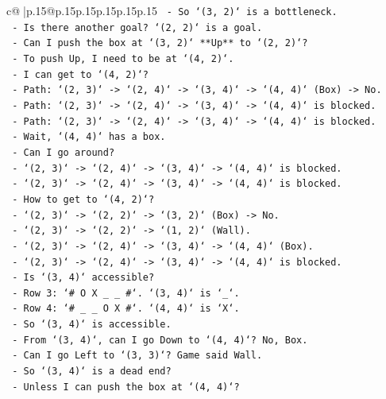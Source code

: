 \documentclass{article}
\begin{document}
{\begin{supertabular}{c@{$\;$}|p{.15\linewidth}@{}p{.15\linewidth}p{.15\linewidth}p{.15\linewidth}p{.15\linewidth}p{.15\linewidth}}
{{{\texttt{    {-} So `(3, 2)` is a bottleneck.} \\
\texttt{    {-} Is there another goal? `(2, 2)` is a goal.} \\
\texttt{    {-} Can I push the box at `(3, 2)` **Up** to `(2, 2)`?} \\
\texttt{    {-} To push Up, I need to be at `(4, 2)`.} \\
\texttt{    {-} I can get to `(4, 2)`?} \\
\texttt{    {-} Path: `(2, 3)` {-}> `(2, 4)` {-}> `(3, 4)` {-}> `(4, 4)` (Box) {-}> No.} \\
\texttt{    {-} Path: `(2, 3)` {-}> `(2, 4)` {-}> `(3, 4)` {-}> `(4, 4)` is blocked.} \\
\texttt{    {-} Path: `(2, 3)` {-}> `(2, 4)` {-}> `(3, 4)` {-}> `(4, 4)` is blocked.} \\
\texttt{    {-} Wait, `(4, 4)` has a box.} \\
\texttt{    {-} Can I go around?} \\
\texttt{    {-} `(2, 3)` {-}> `(2, 4)` {-}> `(3, 4)` {-}> `(4, 4)` is blocked.} \\
\texttt{    {-} `(2, 3)` {-}> `(2, 4)` {-}> `(3, 4)` {-}> `(4, 4)` is blocked.} \\
\texttt{    {-} How to get to `(4, 2)`?} \\
\texttt{    {-} `(2, 3)` {-}> `(2, 2)` {-}> `(3, 2)` (Box) {-}> No.} \\
\texttt{    {-} `(2, 3)` {-}> `(2, 2)` {-}> `(1, 2)` (Wall).} \\
\texttt{    {-} `(2, 3)` {-}> `(2, 4)` {-}> `(3, 4)` {-}> `(4, 4)` (Box).} \\
\texttt{    {-} `(2, 3)` {-}> `(2, 4)` {-}> `(3, 4)` {-}> `(4, 4)` is blocked.} \\
\texttt{    {-} Is `(3, 4)` accessible?} \\
\texttt{    {-} Row 3: `\# O X \_ \_ \#`. `(3, 4)` is `\_`.} \\
\texttt{    {-} Row 4: `\# \_ \_ O X \#`. `(4, 4)` is `X`.} \\
\texttt{    {-} So `(3, 4)` is accessible.} \\
\texttt{    {-} From `(3, 4)`, can I go Down to `(4, 4)`? No, Box.} \\
\texttt{    {-} Can I go Left to `(3, 3)`? Game said Wall.} \\
\texttt{    {-} So `(3, 4)` is a dead end?} \\
\texttt{    {-} Unless I can push the box at `(4, 4)`?} \\
}}}
\end{supertabular}}
\end{document}
